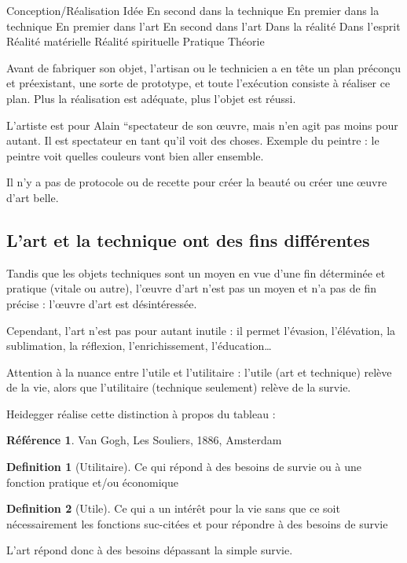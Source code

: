 \documentclass[french]{book}
\theoremstyle{definition}
\newtheorem*{dfn}{Definition}
\newtheorem*{refe}{Référence}
\begin{document}
Conception/Réalisation
Idée
En second dans la technique
En premier dans la technique
En premier dans l’art
En second dans l’art
Dans la réalité
Dans l’esprit
Réalité matérielle
Réalité spirituelle
Pratique
Théorie


Avant de fabriquer son objet, l’artisan ou le technicien a en tête un plan préconçu et préexistant, une sorte de prototype, et toute l’exécution consiste à réaliser ce plan. Plus la réalisation est adéquate, plus l’objet est réussi.

L’artiste est pour Alain “spectateur de son œuvre, mais n’en agit pas moins pour autant. Il est spectateur en tant qu’il voit des choses. Exemple du peintre : le peintre voit quelles couleurs vont bien aller ensemble.

Il n’y a pas de protocole ou de recette pour créer la beauté ou créer une œuvre d’art belle.

\subsection{L’art et la technique ont des fins différentes}

Tandis que les objets techniques sont un moyen en vue d’une fin déterminée et pratique (vitale ou autre), l'œuvre d’art n’est pas un moyen et n’a pas de fin précise : l'œuvre d’art est désintéressée.

Cependant, l’art n’est pas pour autant inutile : il permet l’évasion, l’élévation, la sublimation, la réflexion, l’enrichissement, l’éducation…

Attention à la nuance entre l’utile et l’utilitaire : l’utile (art et technique) relève de la vie, alors que l’utilitaire (technique seulement) relève de la survie.

Heidegger réalise cette distinction à propos du tableau :
\begin{refe}
	Van Gogh, Les Souliers, 1886, Amsterdam
\end{refe}

\begin{dfn}[Utilitaire]
Ce qui répond à des besoins de survie ou à une fonction pratique et/ou économique
\end{dfn}

\begin{dfn}[Utile]
Ce qui a un intérêt pour la vie sans que ce soit nécessairement les fonctions suc-citées et pour répondre à des besoins de survie
\end{dfn}

L’art répond donc à des besoins dépassant la simple survie.
\end{document}
